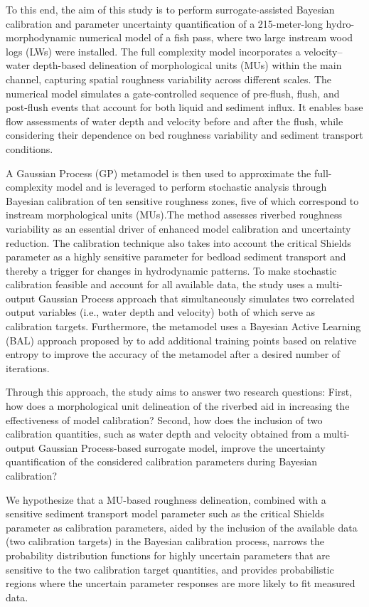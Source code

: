 \documentclass[draft,linenumbers,onecolumn]{agujournal2019} %
\begin{document}
% 
To this end, the aim of this study is to perform surrogate-assisted Bayesian calibration and parameter uncertainty quantification of a 215-meter-long hydro-morphodynamic numerical model of a fish pass, where two large instream wood logs (LWs) were installed. The full complexity model incorporates a velocity–water depth-based delineation of morphological units (MUs) within the main channel, capturing spatial roughness variability across different scales. The numerical model simulates a gate-controlled sequence of pre-flush, flush, and post-flush events that account for both liquid and sediment influx. It enables base flow assessments of water depth and velocity before and after the flush, while considering their dependence on bed roughness variability and sediment transport conditions.

A Gaussian Process (GP) metamodel is then used to approximate the full-complexity model and is leveraged to perform stochastic analysis through Bayesian calibration of ten sensitive roughness zones, five of which correspond to instream morphological units (MUs).The method assesses riverbed roughness variability as an essential driver of enhanced model calibration and uncertainty reduction. The calibration technique also takes into account the critical Shields parameter as a highly sensitive parameter for bedload sediment transport and thereby a trigger for changes in hydrodynamic patterns. To make stochastic calibration feasible and account for all available data, the study uses a multi-output Gaussian Process approach that simultaneously simulates two correlated output variables (i.e., water depth and velocity) both of which serve as calibration targets. Furthermore, the metamodel uses a Bayesian Active Learning (BAL) approach proposed by  to add additional training points based on relative entropy to improve the accuracy of the metamodel after a desired number of iterations. 

Through this approach, the study aims to answer two research questions: First, how does a morphological unit delineation of the riverbed aid in increasing the effectiveness of model calibration? Second, how does the inclusion of two calibration quantities, such as water depth and velocity obtained from a multi-output Gaussian Process-based surrogate model, improve the uncertainty quantification of the considered calibration parameters during Bayesian calibration?

We hypothesize that a MU-based roughness delineation, combined with a sensitive sediment transport model parameter such as the critical Shields parameter as calibration parameters, aided by the inclusion of the available data (two calibration targets) in the Bayesian calibration process, narrows the probability distribution functions for highly uncertain parameters that are sensitive to the two calibration target quantities, and provides probabilistic regions where the uncertain parameter responses are more likely to fit measured data.  
\end{document}
